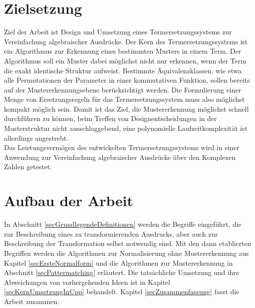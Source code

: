 \section{Zielsetzung}
Ziel der Arbeit ist Design und Umsetzung eines Termersetzungssystems zur Vereinfachung algebraischer Ausdrücke. Der Kern des Termersetzungssystems ist ein Algorithmus zur Erkennung eines bestimmten Musters in einem Term. 
Der Algorithmus soll ein Muster dabei möglichst nicht nur erkennen, wenn der Term die exakt identische Struktur aufweist. Bestimmte Äquivalenzklassen, wie etwa alle Permutationen der Parameter in einer kommutativen Funktion, sollen bereits auf der Mustererkennungsebene berücksichtigt werden. Die Formulierung einer Menge von Ersetzungsregeln für das Termersetzungssystem muss also möglichst kompakt möglich sein. 
Damit ist das Ziel, die Mustererkennung möglichst schnell durchführen zu können, beim Treffen von Designentscheidungen in der Musterstruktur nicht ausschlaggebend, eine polynomielle Laufzeitkomplexität ist allerdings angestrebt.\\
Das Leistungsvermögen des entwickelten Termersetzungssystems wird in einer Anwendung zur Vereinfachung algebraischer Ausdrücke über den Komplexen Zahlen getestet. 

\section{Aufbau der Arbeit}
In Abschnitt \ref{secGrundlegendeDefinitionen} werden die Begriffe eingeführt, die zur Beschreibung eines zu transformierenden Ausdrucks, aber auch zur Beschreibung der Transformation selbst notwendig sind. Mit den dann etablierten Begriffen werden die Algorithmen zur Normalisierung ohne Mustererkennung aus Kapitel \ref{secErsteNormalform} und die Algorithmen zur Mustererkennung in Abschnitt \ref{secPattermatching} erläutert. 
Die tatsächliche Umsetzung und ihre Abweichungen von vorhergehenden Ideen ist in Kapitel \ref{secKernUmsetzungInCpp} behandelt. 
Kapitel \ref{secZusammenfassung} fasst die Arbeit zusammen.



